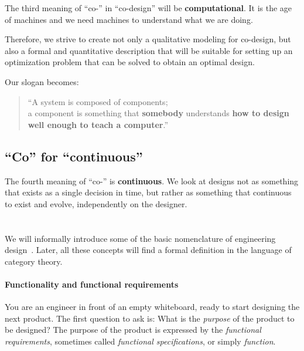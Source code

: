 The third meaning of ``co-'' in ``co-design'' will be \textbf{computational}.
It is the age of machines and we need machines to understand what we are doing.

Therefore, we strive to create not only a qualitative modeling for co-design, but also a formal and quantitative description that will be suitable for setting up an optimization problem that can be solved to obtain an optimal design.

Our slogan becomes:

\begin{quote}
    \enquote{A system is composed of components;\\
    a component is something that \textbf{somebody} understands
    \textbf{how to design} \textbf{well enough to teach a computer}.}
\end{quote}

\subsection{``Co'' for ``continuous''}

The fourth meaning of ``co-'' is \textbf{continuous}.
We look at designs not as something that exists as a single decision in time, but rather as something that continuous to exist and evolve, independently on the designer.





\section{}

We will informally introduce some of the basic nomenclature of engineering
design~\cite{antonsson2005formal,deweck2011}.
Later, all these concepts will find a formal
definition in the language of category theory.

\paragraph{Functionality and functional requirements} You are an engineer in front of an empty whiteboard, ready to start designing the next product.
The first question to ask is: What is the \emph{purpose} of the product to be designed? The purpose of the product is expressed by the \emph{functional requirements}, sometimes called
\emph{functional specifications}, or simply \emph{function}.

